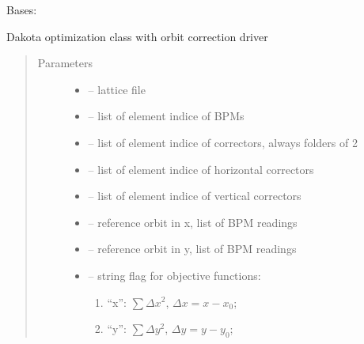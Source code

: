 \documentclass[letterpaper,10pt,english]{sphinxmanual}
\begin{document}

\begin{fulllineitems}
\label{\detokenize{src/apidocs/genopt:genopt.DakotaOC}}
Bases: {\hyperref[\detokenize{src/apidocs/dakopt:genopt.dakopt.DakotaBase}]{}}

Dakota optimization class with orbit correction driver
\begin{quote}\begin{description}
\item[{Parameters}] \leavevmode\begin{itemize}
\item {} 
 -- lattice file

\item {} 
 -- list of element indice of BPMs

\item {} 
 -- list of element indice of correctors, always folders of 2

\item {} 
 -- list of element indice of horizontal correctors

\item {} 
 -- list of element indice of vertical correctors

\item {} 
 -- reference orbit in x, list of BPM readings

\item {} 
 -- reference orbit in y, list of BPM readings

\item {} 
 -- 
string flag for objective functions:
\begin{enumerate}
\item {} 
``x'': \(\sum \Delta x^2\), \(\Delta x = x-x_0\);

\item {} 
``y'': \(\sum \Delta y^2\), \(\Delta y = y-y_0\);


\end{enumerate}
\end{itemize}
\end{description}
\end{quote}
\end{fulllineitems}
\end{document}
